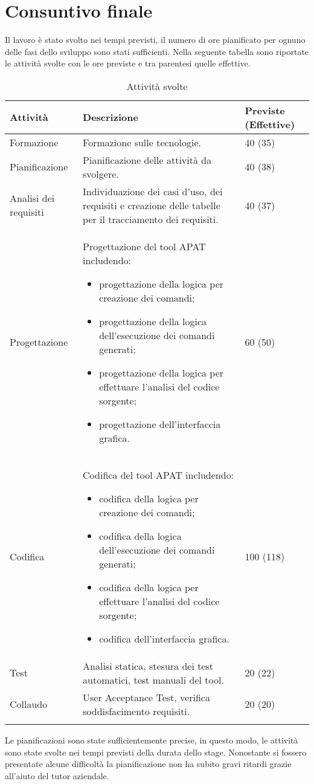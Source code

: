 


\section{Consuntivo finale}\label{sec:consuntivo-finale}
Il lavoro è stato svolto nei tempi previsti, il numero di ore pianificato per ognuno delle fasi dello sviluppo sono stati sufficienti.
Nella seguente tabella sono riportate le attività svolte con le ore previste e tra parentesi quelle effettive.

\begin{longtable}{|C{3cm}|C{8cm}|C{2cm}|}
    \hline
    \textbf{Attività} &
    \textbf{Descrizione} &
    \textbf{Previste} (\textbf{Effettive}) \\\hline
    Formazione     & Formazione sulle tecnologie.
    & 40 (35) \\\hline
    Pianificazione & Pianificazione delle attività da svolgere.
    & 40 (38)    \\\hline
    Analisi dei requisiti & Individuazione dei casi d'uso, dei requisiti e creazione delle tabelle per il tracciamento dei requisiti.
    & 40 (37) \\\hline

    Progettazione & Progettazione del tool APAT includendo:
    \begin{itemize}\itemsep0em
        \item progettazione della logica per creazione dei comandi;
        \item progettazione della logica dell'esecuzione dei comandi generati;
        \item progettazione della logica per effettuare l'analisi del codice sorgente;
        \item progettazione dell'interfaccia grafica.
    \end{itemize}
    &60 (50)\\\hline
    Codifica & Codifica del tool APAT includendo:
    \begin{itemize}\itemsep0em
        \item codifica della logica per creazione dei comandi;
        \item codifica della logica dell'esecuzione dei comandi generati;
        \item codifica della logica per effettuare l'analisi del codice sorgente;
        \item codifica dell'interfaccia grafica.
    \end{itemize}
    & 100 (118) \\\hline
    Test           & Analisi statica, stesura dei test automatici, test manuali del tool.
    & 20 (22)   \\\hline
    Collaudo       & User Acceptance Test, verifica soddisfacimento requisiti.
    & 20 (20)    \\\hline
    \caption{Attività svolte}
\end{longtable}
Le pianificazioni sono state sufficientemente precise, in questo modo, le attività sono state svolte nei tempi previsti della durata dello stage.
Nonostante si fossero presentate alcune difficoltà la pianificazione non ha subito gravi ritardi grazie all'aiuto del tutor aziendale.